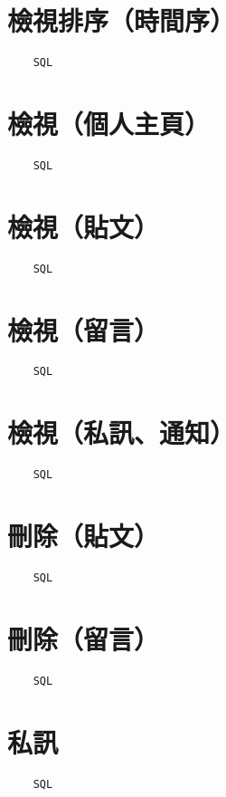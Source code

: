 \documentclass[12pt,a4paper]{article}
\begin{document}
\section*{檢視排序（時間序）}
\begin{lstlisting}
    SQL
\end{lstlisting}

\section*{檢視（個人主頁）}
\begin{lstlisting}
    SQL
\end{lstlisting}

\section*{檢視（貼文）}
\begin{lstlisting}
    SQL
\end{lstlisting}

\section*{檢視（留言）}
\begin{lstlisting}
    SQL
\end{lstlisting}

\section*{檢視（私訊、通知）}
\begin{lstlisting}
    SQL
\end{lstlisting}

\section*{刪除（貼文）}
\begin{lstlisting}
    SQL
\end{lstlisting}

\section*{刪除（留言）}
\begin{lstlisting}
    SQL
\end{lstlisting}

\section*{私訊}
\begin{lstlisting}
    SQL
\end{lstlisting}
\end{document}
